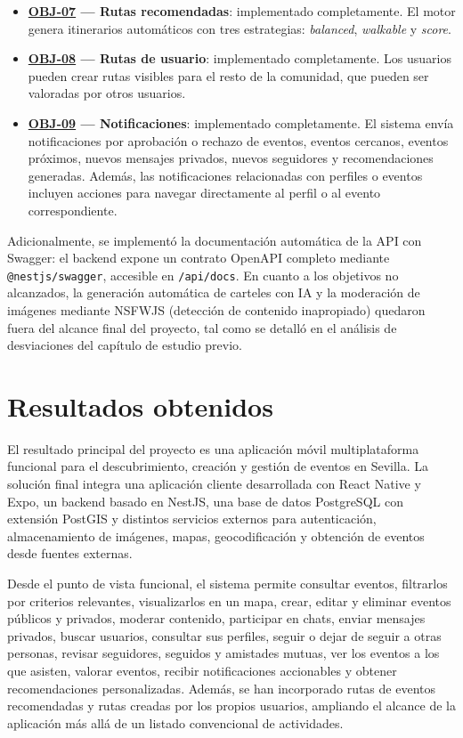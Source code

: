 \begin{itemize}
    \item \textbf{\hyperref[obj:07]{OBJ-07} --- Rutas recomendadas}: implementado completamente. El motor genera itinerarios automáticos con tres estrategias: \textit{balanced}, \textit{walkable} y \textit{score}.

    \item \textbf{\hyperref[obj:08]{OBJ-08} --- Rutas de usuario}: implementado completamente. Los usuarios pueden crear rutas visibles para el resto de la comunidad, que pueden ser valoradas por otros usuarios.

    \item \textbf{\hyperref[obj:09]{OBJ-09} --- Notificaciones}: implementado completamente. El sistema envía notificaciones por aprobación o rechazo de eventos, eventos cercanos, eventos próximos, nuevos mensajes privados, nuevos seguidores y recomendaciones generadas. Además, las notificaciones relacionadas con perfiles o eventos incluyen acciones para navegar directamente al perfil o al evento correspondiente.
\end{itemize}

Adicionalmente, se implementó la documentación automática de la API con Swagger: el backend expone un contrato OpenAPI completo mediante \texttt{@nestjs/swagger}, accesible en \texttt{/api/docs}. En cuanto a los objetivos no alcanzados, la generación automática de carteles con IA y la moderación de imágenes mediante NSFWJS (detección de contenido inapropiado) quedaron fuera del alcance final del proyecto, tal como se detalló en el análisis de desviaciones del capítulo de estudio previo.

\section{Resultados obtenidos}

El resultado principal del proyecto es una aplicación móvil multiplataforma funcional para el descubrimiento, creación y gestión de eventos en Sevilla. La solución final integra una aplicación cliente desarrollada con React Native y Expo, un backend basado en NestJS, una base de datos PostgreSQL con extensión PostGIS y distintos servicios externos para autenticación, almacenamiento de imágenes, mapas, geocodificación y obtención de eventos desde fuentes externas.

Desde el punto de vista funcional, el sistema permite consultar eventos, filtrarlos por criterios relevantes, visualizarlos en un mapa, crear, editar y eliminar eventos públicos y privados, moderar contenido, participar en chats, enviar mensajes privados, buscar usuarios, consultar sus perfiles, seguir o dejar de seguir a otras personas, revisar seguidores, seguidos y amistades mutuas, ver los eventos a los que asisten, valorar eventos, recibir notificaciones accionables y obtener recomendaciones personalizadas. Además, se han incorporado rutas de eventos recomendadas y rutas creadas por los propios usuarios, ampliando el alcance de la aplicación más allá de un listado convencional de actividades.

